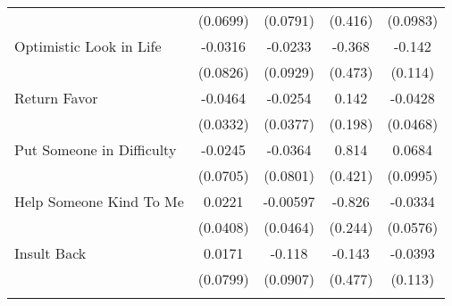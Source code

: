 {\begin{tabular}{l*{4}{c}}
            &    (0.0699)         &    (0.0791)         &     (0.416)         &    (0.0983)         \\
[1em]
Optimistic Look in Life&     -0.0316         &     -0.0233         &      -0.368         &      -0.142         \\
            &    (0.0826)         &    (0.0929)         &     (0.473)         &     (0.114)         \\
[1em]
Return Favor&     -0.0464         &     -0.0254         &       0.142         &     -0.0428         \\
            &    (0.0332)         &    (0.0377)         &     (0.198)         &    (0.0468)         \\
[1em]
Put Someone in Difficulty&     -0.0245         &     -0.0364         &       0.814         &      0.0684         \\
            &    (0.0705)         &    (0.0801)         &     (0.421)         &    (0.0995)         \\
[1em]
Help Someone Kind To Me&      0.0221         &    -0.00597         &      -0.826\sym{***}&     -0.0334         \\
            &    (0.0408)         &    (0.0464)         &     (0.244)         &    (0.0576)         \\
[1em]
Insult Back &      0.0171         &      -0.118         &      -0.143         &     -0.0393         \\
            &    (0.0799)         &    (0.0907)         &     (0.477)         &     (0.113)         \\
\hline\hline
{}\\
\end{tabular}
}
